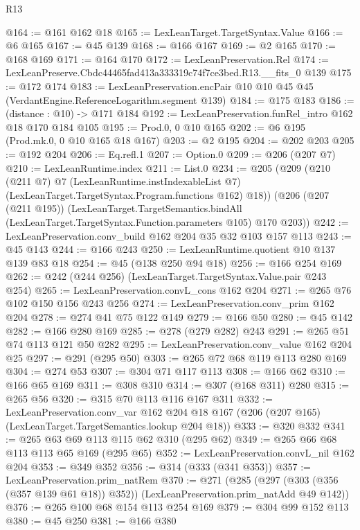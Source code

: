 \begin{lexlean}{R13}
\begin{coremodule}
@164 := @161 @162 @18
@165 := LexLeanTarget.TargetSyntax.Value
@166 := @6 @165
@167 := @45 @139
@168 := @166 @167
@169 := @2 @165
@170 := @168 @169
@171 := @164 @170
@172 := LexLeanPreservation.Rel
@174 := LexLeanPreserve.Cbdc44465fad413a333319c74f7ce3bed.R13.__fits_0 @139
@175 := @172 @174
@183 := LexLeanPreservation.encPair @10 @10 @45 @45 (VerdantEngine.ReferenceLogarithm.segment @139)
@184 := @175 @183
@186 := (distance : @10) -> @171 @184
@192 := LexLeanPreservation.funRel_intro @162 @18 @170 @184 @105
@195 := Prod.{0, 0} @10 @165
@202 := @6 @195 (Prod.mk.{0, 0} @10 @165 @18 @167)
@203 := @2 @195
@204 := @202 @203
@205 := @192 @204
@206 := Eq.refl.{1}
@207 := Option.{0}
@209 := @206 (@207 @7)
@210 := LexLeanRuntime.index
@211 := List.{0}
@234 := @205
    (@209
      (@210
        (@211 @7)
        @7
        (LexLeanRuntime.instIndexableList @7)
        (LexLeanTarget.TargetSyntax.Program.functions @162)
        @18))
    (@206
      (@207 (@211 @195))
      (LexLeanTarget.TargetSemantics.bindAll
        (LexLeanTarget.TargetSyntax.Function.parameters @105)
        @170
        @203))
@242 := LexLeanPreservation.conv_build @162 @204 @35 @32 @103 @157 @113
@243 := @45 @143
@244 := @166 @243
@250 := LexLeanRuntime.quotient @10 @137 @139 @83 @18
@254 := @45 (@138 @250 @94 @18)
@256 := @166 @254 @169
@262 := @242 (@244 @256) (LexLeanTarget.TargetSyntax.Value.pair @243 @254)
@265 := LexLeanPreservation.convL_cons @162 @204
@271 := @265 @76 @102 @150 @156 @243 @256
@274 := LexLeanPreservation.conv_prim @162 @204
@278 := @274 @41 @75 @122 @149
@279 := @166 @50
@280 := @45 @142
@282 := @166 @280 @169
@285 := @278 (@279 @282) @243
@291 := @265 @51 @74 @113 @121 @50 @282
@295 := LexLeanPreservation.conv_value @162 @204 @25
@297 := @291 (@295 @50)
@303 := @265 @72 @68 @119 @113 @280 @169
@304 := @274 @53
@307 := @304 @71 @117 @113
@308 := @166 @62
@310 := @166 @65 @169
@311 := @308 @310
@314 := @307 (@168 @311) @280
@315 := @265 @56
@320 := @315 @70 @113 @116 @167 @311
@332 := LexLeanPreservation.conv_var
    @162
    @204
    @18
    @167
    (@206 (@207 @165) (LexLeanTarget.TargetSemantics.lookup @204 @18))
@333 := @320 @332
@341 := @265 @63 @69 @113 @115 @62 @310 (@295 @62)
@349 := @265 @66 @68 @113 @113 @65 @169 (@295 @65)
@352 := LexLeanPreservation.convL_nil @162 @204
@353 := @349 @352
@356 := @314 (@333 (@341 @353))
@357 := LexLeanPreservation.prim_natRem
@370 := @271
    (@285 (@297 (@303 (@356 (@357 @139 @61 @18)) @352)) (LexLeanPreservation.prim_natAdd @49 @142))
@376 := @265 @100 @68 @154 @113 @254 @169
@379 := @304 @99 @152 @113
@380 := @45 @250
@381 := @166 @380

\end{coremodule}
\end{lexlean}
